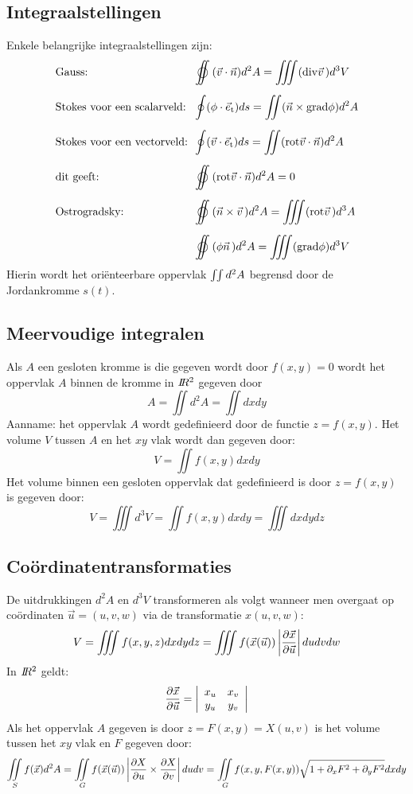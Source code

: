 \subsection{Integraalstellingen}
Enkele belangrijke integraalstellingen zijn:
\[
\begin{array}{l@{~~}l}
\mbox{Gauss:}&\displaystyle\oiint(\vec{v}\cdot\vec{n})d^2A=\iiint({\rm div}\vvec{v})d^3V\\[5mm]
\mbox{Stokes voor een scalarveld:}&\displaystyle\oint(\phi\cdot\e{t})ds=\iint(\vec{n}\times{\rm grad}\phi)d^2A\\[5mm]
\mbox{Stokes voor een vectorveld:}&\displaystyle\oint(\vec{v}\cdot\e{t})ds=\iint({\rm rot}\vec{v}\cdot\vec{n})d^2A\\[5mm]
\mbox{dit geeft:}&\displaystyle\oiint({\rm rot}\vec{v}\cdot\vec{n})d^2A=0\\[5mm]
\mbox{Ostrogradsky:}&\displaystyle\oiint(\vec{n}\times\vvec{v})d^2A=\iiint({\rm rot}\vvec{v})d^3A\\[5mm]
\mbox{}&\displaystyle\oiint(\phi\vvec{n})d^2A=\iiint({\rm grad}\phi)d^3V
\end{array}
\]
Hierin wordt het ori\"enteerbare oppervlak $\int\hspace{-1mm}\int d^2A$
begrensd door de Jordankromme $s(t)$.

\subsection{Meervoudige integralen}
Als $A$ een gesloten kromme is die gegeven wordt door $f(x,y)=0$ wordt
het oppervlak $A$ binnen de kromme in $I\hspace{-1mm}R^2$ gegeven door
\[
A=\iint d^2A=\iint dxdy
\]
Aanname: het oppervlak $A$ wordt gedefinieerd door de functie $z=f(x,y)$.
Het volume $V$ tussen $A$ en het $xy$ vlak wordt dan gegeven door:
\[
V=\iint f(x,y)dxdy
\]
Het volume binnen een gesloten oppervlak dat gedefinieerd is door $z=f(x,y)$
is gegeven door:
\[
V=\iiint d^3V=\iint f(x,y)dxdy=\iiint dxdydz
\]

\subsection{Co\"ordinatentransformaties}
De uitdrukkingen $d^2A$ en $d^3V$ transformeren als volgt wanneer men
overgaat op co\"ordinaten $\vec{u}=(u,v,w)$ via de transformatie $x(u,v,w)$:
\[
V=\iiint f(x,y,z)dxdydz=\iiint f(\vec{x}(\vec{u}))\left|\Q{\vec{x}}{\vec{u}}\right|dudvdw
\]
In $I\hspace{-1mm}R^2$ geldt:
\[
\frac{\partial \vec{x}}{\partial \vec{u}}=\left|\begin{array}{cc}x_u&x_v\\ y_u&y_v\end{array}\right|
\]
Als het oppervlak $A$ gegeven is door $z=F(x,y)=X(u,v)$ is het volume tussen
het $xy$ vlak en $F$ gegeven door:
\[
\int\hspace{-1.5ex}\int\limits_Sf(\vec{x})d^2A=\int\hspace{-1.5ex}\int\limits_Gf(\vec{x}(\vec{u}))
\left|\frac{\partial X}{\partial u}\times\frac{\partial X}{\partial v}\right|dudv=
\int\hspace{-1.5ex}\int\limits_Gf(x,y,F(x,y))\sqrt{1+\partial_xF^2+\partial_yF^2}dxdy
\]


